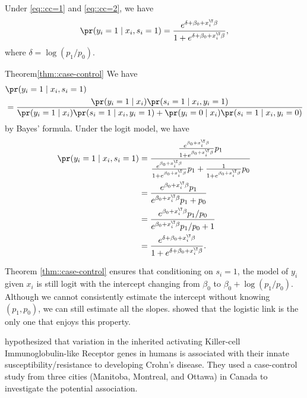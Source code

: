 \begin{theorem}
\label{thm::case-control}
Under \eqref{eq::cc=1} and \eqref{eq::cc=2}, we have 
$$
\pr(y_{i}  =1\mid x_{i},s_{i}=1)
= \frac{e^{\delta+\beta_{0}+x_{i}^{\T}\beta}}{1+e^{\delta+\beta_{0}+x_{i}^{\T}\beta}}, 
$$
where $\delta=\log(p_{1}/p_{0})$. 
\end{theorem}

\begin{myproof}{Theorem}{\ref{thm::case-control}}
We have 
\begin{align*}
&\pr(y_{i}  =1\mid x_{i},s_{i}=1)\\
 & =\frac{\pr(y_{i}=1\mid x_{i})\pr(s_{i}=1\mid x_{i},y_{i}=1)}{\pr(y_{i}=1\mid x_{i})\pr(s_{i}=1\mid x_{i},y_{i}=1)+\pr(y_{i}=0\mid x_{i})\pr(s_{i}=1\mid x_{i},y_{i}=0)}
 \end{align*}
 by Bayes' formula. Under the logit model, we have
 \begin{align*}
\pr(y_{i}  =1\mid x_{i},s_{i}=1)
 & =\frac{\frac{e^{\beta_{0}+x_{i}^{\T}\beta}}{1+e^{\beta_{0}+x_{i}^{\T}\beta}}p_{1}}{\frac{e^{\beta_{0}+x_{i}^{\T}\beta}}{1+e^{\beta_{0}+x_{i}^{\T}\beta}}p_{1}+\frac{1}{1+e^{\beta_{0}+x_{i}^{\T}\beta}}p_{0}}\\
 & =\frac{e^{\beta_{0}+x_{i}^{\T}\beta}p_{1}}{e^{\beta_{0}+x_{i}^{\T}\beta}p_{1}+p_{0}}\\
 & =\frac{e^{\beta_{0}+x_{i}^{\T}\beta}p_{1}/p_{0}}{e^{\beta_{0}+x_{i}^{\T}\beta}p_{1}/p_{0}+1}\\
 & =\frac{e^{\delta+\beta_{0}+x_{i}^{\T}\beta}}{1+e^{\delta+\beta_{0}+x_{i}^{\T}\beta}} . 
\end{align*}
\end{myproof}

Theorem \ref{thm::case-control} ensures that conditioning on $s_{i}=1$,
the model of $y_{i}$ given $x_{i}$ is still logit with the intercept
changing from $\beta_{0}$ to $\beta_{0}+\log(p_{1}/p_{0})$. Although
we cannot consistently estimate the intercept without knowing $(p_{1},p_{0})$,
we can still estimate all the slopes. \citet{kagan2001note} showed that the logistic link is the only one that enjoys this property. 


\citet{samarani2019activating} hypothesized that variation in the inherited activating Killer-cell Immunoglobulin-like Receptor genes in humans is associated with their innate susceptibility/resistance to developing Crohn's disease. They used a case-control study from three cities (Manitoba,  Montreal, and Ottawa) in Canada to investigate the potential association. 
 
